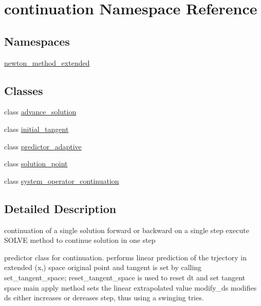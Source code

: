 \hypertarget{namespacecontinuation}{\section{continuation Namespace Reference}
\label{namespacecontinuation}
}
\subsection*{Namespaces}
\begin{DoxyCompactItemize}
\item 
\hyperlink{namespacecontinuation_1_1newton__method__extended}{newton\-\_\-method\-\_\-extended}
\end{DoxyCompactItemize}
\subsection*{Classes}
\begin{DoxyCompactItemize}
\item 
class \hyperlink{classcontinuation_1_1advance__solution}{advance\-\_\-solution}
\item 
class \hyperlink{classcontinuation_1_1initial__tangent}{initial\-\_\-tangent}
\item 
class \hyperlink{classcontinuation_1_1predictor__adaptive}{predictor\-\_\-adaptive}
\item 
class \hyperlink{classcontinuation_1_1solution__point}{solution\-\_\-point}
\item 
class \hyperlink{classcontinuation_1_1system__operator__continuation}{system\-\_\-operator\-\_\-continuation}
\end{DoxyCompactItemize}


\subsection{Detailed Description}
continuation of a single solution forward or backward on a single step execute S\-O\-L\-V\-E method to continue solution in one step

predictor class for continuation. performs linear prediction of the trjectory in extended (x,) space original point and tangent is set by calling set\-\_\-tangent\-\_\-space; reset\-\_\-tangent\-\_\-space is used to reset dt and set tangent space main apply method sets the linear extrapolated value modify\-\_\-ds modifies ds either increases or dereases step, thus using a swinging tries. 